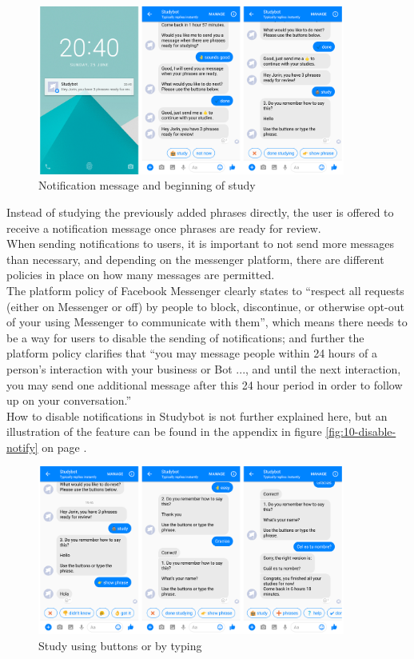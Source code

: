 \begin{figure}[h]
  \centering
  \includegraphics[width=0.9\textwidth]{images/interface/07-notify-study.png}
	\caption{Notification message and beginning of study}
	\label{fig:07-notify-study}
\end{figure}

Instead of studying the previously added phrases directly,
the user is offered to receive a notification message once phrases are ready for review.
\\

When sending notifications to users, it is important to not send more messages than necessary,
and depending on the messenger platform, there are different policies in place on how many messages are permitted.
\\
The platform policy of Facebook Messenger clearly states to
``respect all requests (either on Messenger or off) by people to block, discontinue, or otherwise opt-out of your using Messenger to communicate with them''\cite{fbpolicy},
which means there needs to be a way for users to disable the sending of notifications;
and further the platform policy clarifies that ``you may message people within 24 hours of a person's interaction with your business or Bot ..., and until the next interaction, you may send one additional message after this 24 hour period in order to follow up on your conversation.''\cite{fbpolicy}
\\
How to disable notifications in Studybot is not further explained here,
but an illustration of the feature can be found in the appendix in figure \ref{fig:10-disable-notify} on page \pageref{fig:10-disable-notify}.
\\

\begin{figure}[h]
  \centering
  \includegraphics[width=0.9\textwidth]{images/interface/08-study-done.png}
	\caption{Study using buttons or by typing}
	\label{fig:08-study-done}
\end{figure}

